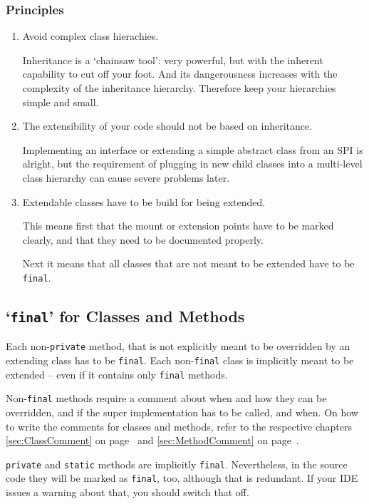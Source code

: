 \documentclass[11pt,a4paper, titlepage, parskip=half, headsepline, footsepline, cleardoublepage=current, headheight=1cm]{scrbook}
\newcommand*{\tqvref}[1]{\hyperref[{#1}]{\ref*{#1}} on page~\pageref{#1}}
\begin{document}
\subsubsection{Principles}
\begin{enumerate}[label=P\arabic*.]
\item{Avoid complex class hierachies.

Inheritance is a ‘chainsaw tool’: very powerful, but with the inherent capability to cut off your foot. And its dangerousness increases with the complexity of the inheritance hierarchy. Therefore keep your hierarchies simple and small.}

\item{The extensibility of your code should not be based on inheritance.

Implementing an interface or extending a simple abstract class from an SPI is alright, but the requirement of plugging in new child classes into a multi-level class hierarchy can cause severe problems later.}

\item{Extendable classes have to be build for being extended.

This means first that the mount or extension points have to be marked clearly, and that they need to be documented properly.

Next it means that all classes that are not meant to be extended have to be \lstinline|final|.}
\end{enumerate}


\subsection{‘\lstinline|final|’ for Classes and Methods}
Each non-\lstinline|private| method, that is not explicitly meant to be overridden by an extending class has to be \lstinline|final|. Each non-\lstinline|final| class is implicitly meant to be extended – even if it contains only \lstinline|final| methods.

Non-\lstinline|final| methods require a comment about when and how they can be overridden, and if the super implementation has to be called, and when. On how to write the comments for classes and methods, refer to the respective chapters \tqvref{sec:ClassComment} and \tqvref{sec:MethodComment}.

\lstinline|private| and \lstinline|static| methods are implicitly \lstinline|final|. Nevertheless, in the source code they will be marked as \lstinline|final|, too, although that is redundant. If your IDE issues a warning about that, you should switch that off.
\end{document}
